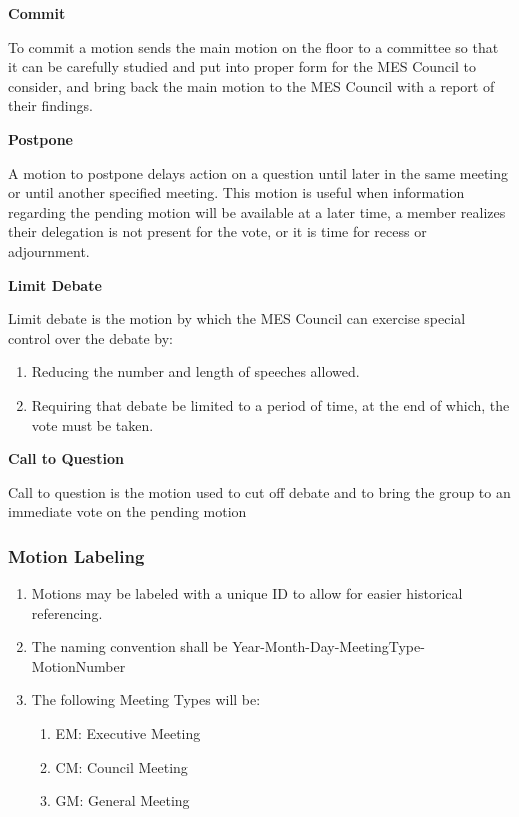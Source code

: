 \textbf{Commit}

To commit a motion sends the main motion on the floor to a committee so that it can be carefully studied and put into proper form for the MES Council to consider, and bring back the main motion to the MES Council with a report of their findings.

\textbf{Postpone}

A motion to postpone delays action on a question until later in the same meeting or until another specified meeting. This motion is useful when information regarding the pending motion will be available at a later time, a member realizes their delegation is not present for the vote, or it is time for recess or adjournment.

\textbf{Limit Debate}

Limit debate is the motion by which the MES Council can exercise special control over the debate by:

\begin{enumerate}
 \item
  Reducing the number and length of speeches allowed.
 \item
  Requiring that debate be limited to a period of time, at the end of which, the vote must be taken.
\end{enumerate}

\textbf{Call to Question}

Call to question is the motion used to cut off debate and to bring the group to an immediate vote on the pending motion

\subsubsection{Motion Labeling}
\label{motion-labeling}
\begin{enumerate}
 \item 
  Motions may be labeled with a unique ID to allow for easier historical referencing.
 \item 
  The naming convention shall be Year-Month-Day-MeetingType-MotionNumber
 \item The following Meeting Types will be:
\begin{enumerate}
  \item 
   EM: Executive Meeting
  \item 
   CM: Council Meeting
  \item 
   GM: General Meeting
\end{enumerate}
\end{enumerate}


